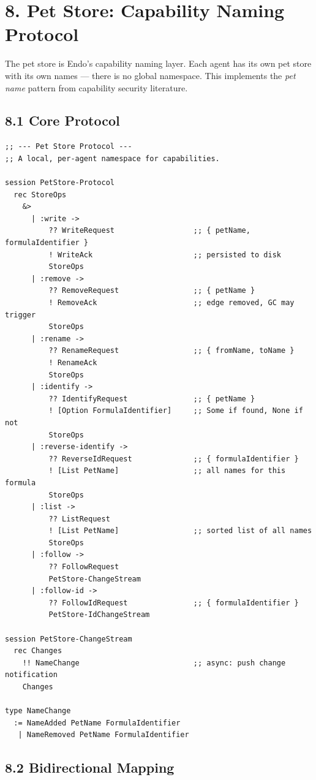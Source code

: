 \documentclass[11pt]{article}
\begin{document}
\section{8. Pet Store: Capability Naming Protocol}
\label{sec:orgd090064}

The pet store is Endo's capability naming layer. Each agent has its own
pet store with its own names --- there is no global namespace. This
implements the \emph{pet name} pattern from capability security literature.
\subsection{8.1 Core Protocol}
\label{sec:orgd2269d9}

\begin{verbatim}
;; --- Pet Store Protocol ---
;; A local, per-agent namespace for capabilities.

session PetStore-Protocol
  rec StoreOps
    &>
      | :write ->
          ?? WriteRequest                  ;; { petName, formulaIdentifier }
          ! WriteAck                       ;; persisted to disk
          StoreOps
      | :remove ->
          ?? RemoveRequest                 ;; { petName }
          ! RemoveAck                      ;; edge removed, GC may trigger
          StoreOps
      | :rename ->
          ?? RenameRequest                 ;; { fromName, toName }
          ! RenameAck
          StoreOps
      | :identify ->
          ?? IdentifyRequest               ;; { petName }
          ! [Option FormulaIdentifier]     ;; Some if found, None if not
          StoreOps
      | :reverse-identify ->
          ?? ReverseIdRequest              ;; { formulaIdentifier }
          ! [List PetName]                 ;; all names for this formula
          StoreOps
      | :list ->
          ?? ListRequest
          ! [List PetName]                 ;; sorted list of all names
          StoreOps
      | :follow ->
          ?? FollowRequest
          PetStore-ChangeStream
      | :follow-id ->
          ?? FollowIdRequest               ;; { formulaIdentifier }
          PetStore-IdChangeStream

session PetStore-ChangeStream
  rec Changes
    !! NameChange                          ;; async: push change notification
    Changes

type NameChange
  := NameAdded PetName FormulaIdentifier
   | NameRemoved PetName FormulaIdentifier
\end{verbatim}
\subsection{8.2 Bidirectional Mapping}
\label{sec:org57ed1a1}
\end{document}
